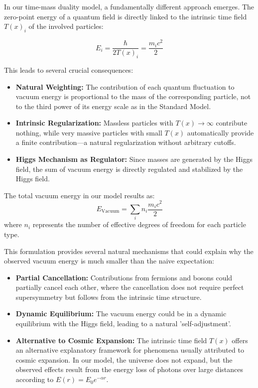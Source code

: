 \documentclass[a4paper,12pt]{article}
\newcommand{\Tfield}{T(x)} %
\begin{document}
	In our time-mass duality model, a fundamentally different approach emerges. The zero-point energy of a quantum field is directly linked to the intrinsic time field $\Tfield_i$ of the involved particles:
	
	\begin{equation}
		E_i = \frac{\hbar}{2\Tfield_i} = \frac{m_i c^2}{2}
	\end{equation}
	
	This leads to several crucial consequences:
	
	\begin{itemize}
		\item \textbf{Natural Weighting:} The contribution of each quantum fluctuation to vacuum energy is proportional to the mass of the corresponding particle, not to the third power of its energy scale as in the Standard Model.
		
		\item \textbf{Intrinsic Regularization:} Massless particles with $\Tfield \to \infty$ contribute nothing, while very massive particles with small $\Tfield$ automatically provide a finite contribution—a natural regularization without arbitrary cutoffs.
		
		\item \textbf{Higgs Mechanism as Regulator:} Since masses are generated by the Higgs field, the sum of vacuum energy is directly regulated and stabilized by the Higgs field.
	\end{itemize}
	
	The total vacuum energy in our model results as:
	\begin{equation}
		E_{\text{Vacuum}} = \sum_i n_i \frac{m_i c^2}{2}
	\end{equation}
	where $n_i$ represents the number of effective degrees of freedom for each particle type.
	
	This formulation provides several natural mechanisms that could explain why the observed vacuum energy is much smaller than the naive expectation:
	
	\begin{itemize}
		\item \textbf{Partial Cancellation:} Contributions from fermions and bosons could partially cancel each other, where the cancellation does not require perfect supersymmetry but follows from the intrinsic time structure.
		
		\item \textbf{Dynamic Equilibrium:} The vacuum energy could be in a dynamic equilibrium with the Higgs field, leading to a natural 'self-adjustment'.
		
		\item \textbf{Alternative to Cosmic Expansion:} The intrinsic time field $\Tfield$ offers an alternative explanatory framework for phenomena usually attributed to cosmic expansion. In our model, the universe does not expand, but the observed effects result from the energy loss of photons over large distances according to $E(r) = E_0 e^{-\alpha r}$.
	\end{itemize}
	
\end{document}

